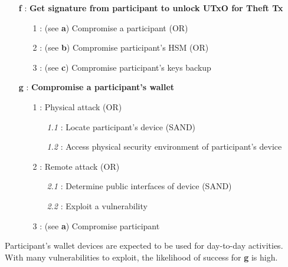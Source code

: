 \documentclass[runningheads]{llncs}
\begin{document}
{\footnotesize
\begin{itemize}[noitemsep,parsep=0pt,partopsep=0pt, leftmargin=0.7cm]
\item[\textbf{f} :] \textbf{Get signature from participant to unlock UTxO for Theft Tx}
\begin{itemize}[noitemsep,topsep=0pt,parsep=0pt,partopsep=0pt, leftmargin=0.8cm]
\item[1 :] (see \textbf{a}) Compromise a participant (OR)
\item[2 :] (see \textbf{b}) Compromise participant's HSM (OR)
\item[3 :] (see \textbf{c}) Compromise participant's keys backup
\end{itemize}
\end{itemize}
}

{\footnotesize
\begin{itemize}[noitemsep,parsep=0pt,partopsep=0pt, leftmargin=0.7cm]
\item[\textbf{g} :] \textbf{Compromise a participant's wallet}
\begin{itemize}[noitemsep,topsep=0pt,parsep=0pt,partopsep=0pt, leftmargin=0.8cm]
\item[1 :] Physical attack (OR)
\begin{itemize}[noitemsep,topsep=0pt,parsep=0pt,partopsep=0pt, leftmargin=0.9cm]
\item[\textit{1.1} :] Locate participant's device (SAND)
\item[\textit{1.2} :] Access physical security environment of participant's device
\end{itemize}
\item[2 :] Remote attack (OR)
\begin{itemize}[noitemsep,topsep=0pt,parsep=0pt,partopsep=0pt, leftmargin=0.9cm]
\item[\textit{2.1} :] Determine public interfaces of device (SAND)
\item[\textit{2.2} :] Exploit a vulnerability
\end{itemize}
\item[3 :] (see \textbf{a}) Compromise participant
\end{itemize}
\end{itemize}
}

\noindent Participant's wallet devices are expected to be used for day-to-day activities. With many vulnerabilities to exploit, the likelihood of success for \textbf{g} is high.
\end{document}
